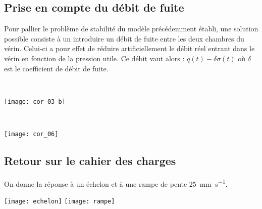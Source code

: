 \subsection*{Prise en compte du débit de fuite} 
\ifprof
\else

Pour pallier le problème de stabilité du modèle précédemment établi, une solution possible consiste à un introduire un débit de fuite entre les deux chambres du vérin. Celui-ci a pour effet de réduire artificiellement le débit réel entrant dans le vérin en fonction de la pression utile. Ce débit vaut alors : $q(t)-\delta \sigma (t)$  où $\delta$ est le coefficient de débit de fuite.
\fi

\ifprof
\newpage
\else \fi

\ifprof
\begin{corrige} ~\\
\begin{center}
\texttt{[image: cor\_03\_b]}
\end{center}
\end{corrige}
\else
\fi


\ifprof
\begin{corrige} ~\\
\begin{center}
\texttt{[image: cor\_06]}
\end{center}
\end{corrige}
\else
\fi
\subsection*{Retour sur le cahier des charges}
On donne la réponse à un échelon et à une rampe de pente \SI{25}{mm.s^{-1}}.



\begin{marginfigure}
\texttt{[image: echelon]}
\texttt{[image: rampe]}
\end{marginfigure}




\ifprof
\else


\fi